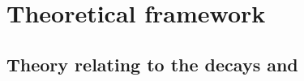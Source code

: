 \chapter{Theoretical framework}
\label{ch:theory}






\section[Introduction for the decays \btokpipimumu and \btophikmumu]{Theory relating to the
  decays \tmath{\btokpipimumu} and \tmath{\btophikmumu}}


%
